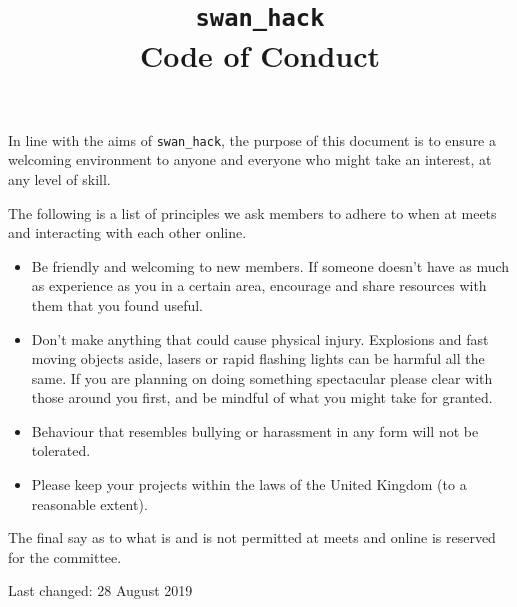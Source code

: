 \documentclass[12pt]{extarticle}
\title{\vspace{-2cm}\texttt{swan\_hack} \\ {Code of Conduct}}
\date{}
\begin{document}
	\maketitle
	In line with the aims of \texttt{swan\_hack}, the purpose of this document is to ensure a welcoming environment to anyone and everyone who might take an interest, at any level of skill. 
	
	The following is a list of principles we ask members to adhere to when at meets and interacting with each other online.
	
	\begin{itemize}
		\item Be friendly and welcoming to new members. If someone doesn't have as much as experience as you in a certain area, encourage and share resources with them that you found useful.
		\item Don't make anything that could cause physical injury. Explosions and fast moving objects aside, lasers or rapid flashing lights can be harmful all the same. If you are planning on doing something spectacular please clear with those around you first, and be mindful of what you might take for granted.
		\item Behaviour that resembles bullying or harassment in any form will not be tolerated.
		\item Please keep your projects within the laws of the United Kingdom (to a reasonable extent).
	\end{itemize}

	The final say as to what is and is not permitted at meets and online is reserved for the committee.
	
	\footnotesize Last changed: 28 August 2019
\end{document}
